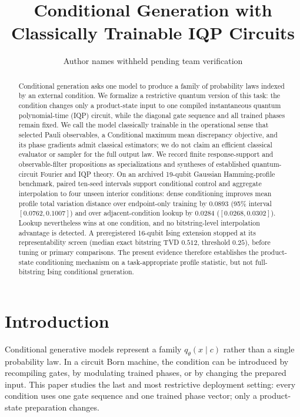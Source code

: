 \documentclass[a4paper,twocolumn,11pt,unpublished]{quantumarticle}
\title{Conditional Generation with Classically Trainable IQP Circuits}
\author{Author names withheld pending team verification}
\affiliation{Affiliations withheld pending team verification}
\begin{document}
\maketitle

\begin{abstract}
Conditional generation asks one model to produce a family of probability laws
indexed by an external condition.  We formalize a restrictive quantum version
of this task: the condition changes only a product-state input to one compiled
instantaneous quantum polynomial-time (IQP) circuit, while the diagonal gate
sequence and all trained phases remain fixed.  We call the model classically
trainable in the operational sense that selected Pauli observables, a
Conditional maximum mean discrepancy objective, and its phase gradients admit
classical estimators; we do not claim an efficient classical evaluator or
sampler for the full output law.  We record finite response-support and
observable-filter propositions as specializations and syntheses of established
quantum-circuit Fourier and IQP theory.  On an archived 19-qubit Gaussian
Hamming-profile benchmark, paired ten-seed intervals support conditional
control and aggregate interpolation to four unseen interior conditions:
dense conditioning improves mean profile total variation distance over
endpoint-only training by $0.0893$ (95\% interval $[0.0762,0.1007]$) and over
adjacent-condition lookup by $0.0284$ ($[0.0268,0.0302]$).  Lookup nevertheless
wins at one condition, and no bitstring-level interpolation advantage is
detected.  A preregistered 16-qubit Ising extension stopped at its
representability screen (median exact bitstring TVD $0.512$, threshold
$0.25$), before tuning or primary comparisons.  The present evidence therefore
establishes the product-state conditioning mechanism on a task-appropriate
profile statistic, but not full-bitstring Ising conditional generation.
\end{abstract}

\section{Introduction}

Conditional generative models represent a family $q_\theta(x\mid c)$ rather
than a single probability law.  In a circuit Born machine, the condition can
be introduced by recompiling gates, by modulating trained phases, or by
changing the prepared input.  This paper studies the last and most restrictive
deployment setting: every condition uses one gate sequence and one trained
phase vector; only a product-state preparation changes.
\end{document}
